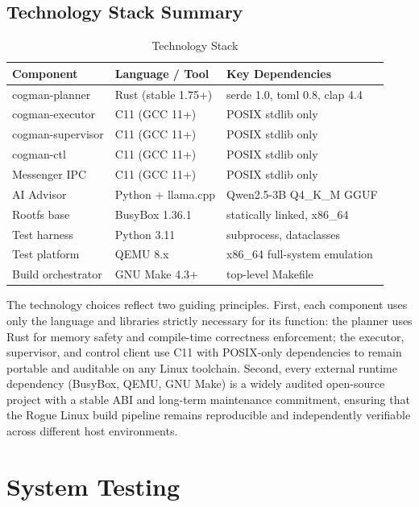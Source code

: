 \documentclass[12pt,a4paper]{report}
\begin{document}
\section{Technology Stack Summary}

\begin{table}[H]
\centering
\caption{Technology Stack}
\renewcommand{\arraystretch}{1.2}
\begin{tabularx}{\linewidth}{l l X}
\toprule
\textbf{Component} & \textbf{Language / Tool} & \textbf{Key Dependencies}\\
\midrule
cogman-planner    & Rust (stable 1.75+)  & serde 1.0, toml 0.8, clap 4.4\\
cogman-executor   & C11 (GCC 11+)        & POSIX stdlib only\\
cogman-supervisor & C11 (GCC 11+)        & POSIX stdlib only\\
cogman-ctl        & C11 (GCC 11+)        & POSIX stdlib only\\
Messenger IPC     & C11 (GCC 11+)        & POSIX stdlib only\\
AI Advisor        & Python + llama.cpp   & Qwen2.5-3B Q4\_K\_M GGUF\\
Rootfs base       & BusyBox 1.36.1       & statically linked, x86\_64\\
Test harness      & Python 3.11          & subprocess, dataclasses\\
Test platform     & QEMU 8.x             & x86\_64 full-system emulation\\
Build orchestrator& GNU Make 4.3+        & top-level Makefile\\
\bottomrule
\end{tabularx}
\end{table}

The technology choices reflect two guiding principles. First, each component uses
only the language and libraries strictly necessary for its function: the planner
uses Rust for memory safety and compile-time correctness enforcement; the executor,
supervisor, and control client use C11 with POSIX-only dependencies to remain
portable and auditable on any Linux toolchain. Second, every external runtime
dependency (BusyBox, QEMU, GNU Make) is a widely audited open-source project with
a stable ABI and long-term maintenance commitment, ensuring that the Rogue Linux
build pipeline remains reproducible and independently verifiable across different
host environments.

\chapter{System Testing}
\end{document}

